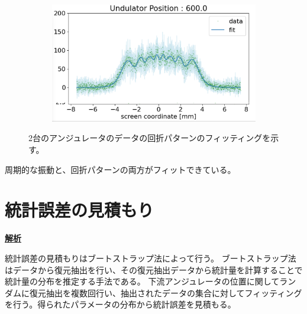\documentclass[a4paper,11pt,uplatex]{jsbook}
\begin{document}
\begin{figure}
\begin{subfigure}[h]{0.45\linewidth}
  \end{subfigure}
  \begin{subfigure}[h]{0.45\linewidth}
    \centering
    \includegraphics[width=\linewidth]{image/4-double_600.png}
  \end{subfigure}
  \caption[2台のアンジュレータのデータ]{2台のアンジュレータのデータの回折パターンのフィッティングを示す。}\label{fig:double}

\end{figure}

周期的な振動と、回折パターンの両方がフィットできている。
  
\section{統計誤差の見積もり}
\noindent \textbf{\underline{解析}}\par
統計誤差の見積もりはブートストラップ法によって行う。
ブートストラップ法はデータから復元抽出を行い、その復元抽出データから統計量を計算することで統計量の分布を推定する手法である。
下流アンジュレータの位置に関してランダムに復元抽出を複数回行い、抽出されたデータの集合に対してフィッティングを行う。得られたパラメータの分布から統計誤差を見積もる。

\end{document}
